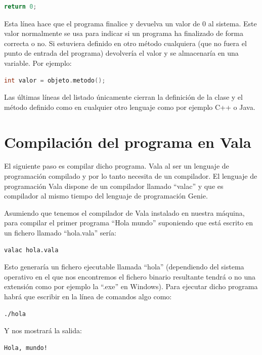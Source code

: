 \documentclass[12pt,twoside]{book}
\begin{document}
\begin{lstlisting}[language=C++]
return 0;
\end{lstlisting}
 
 Esta línea hace que el programa finalice y devuelva un valor de 0 al sistema. Este valor normalmente se usa para indicar si un programa ha finalizado de forma correcta o no. Si estuviera definido en otro método cualquiera (que no fuera el punto de entrada del programa) devolvería el valor y se almacenaría en una variable. Por ejemplo:
 
\begin{lstlisting}[language=C++]
int valor = objeto.metodo();
\end{lstlisting}
 
 
 Las últimas líneas del listado únicamente cierran la definición de la clase y el método definido como en cualquier otro lenguaje como por ejemplo C++ o Java.
 
 \section{Compilación del programa en Vala}
 
  El siguiente paso es compilar dicho programa. Vala al ser un lenguaje de programación compilado y por lo tanto necesita de un compilador. El lenguaje de programación Vala dispone de un compilador llamado ``valac'' y que es compilador al mismo tiempo del lenguaje de programación Genie.
  
  Asumiendo que tenemos el compilador de Vala instalado en nuestra máquina, para compilar el primer programa ``Hola mundo'' suponiendo que está escrito en un fichero llamado ``hola.vala'' sería:

\begin{lstlisting}[language=bash]
valac hola.vala
\end{lstlisting}
 
 Esto generaría un fichero ejecutable llamada ``hola'' (dependiendo del sistema operativo en el que nos encontremos el fichero binario resultante tendrá o no una extensión como por ejemplo la ``.exe'' en Windows). Para ejecutar dicho programa habrá que escribir en la línea de comandos algo como:
 
\begin{lstlisting}
./hola
\end{lstlisting}
 
 Y nos mostrará la salida:
 
\begin{lstlisting}[language=bash]
 Hola, mundo!
\end{lstlisting}
 
\end{document}
